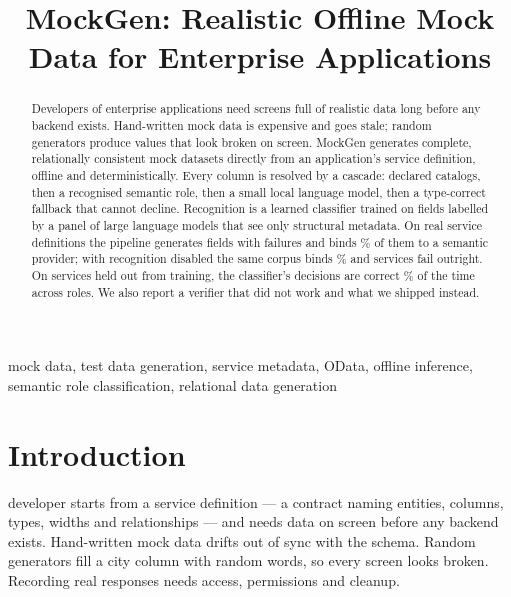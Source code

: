 \documentclass[conference]{IEEEtran}
\newcommand{\system}{MockGen}
\begin{document}
\title{\system: Realistic Offline Mock Data for Enterprise Applications}

\author{
}

\maketitle

\begin{abstract}
Developers of enterprise applications need screens full of realistic
data long before any backend exists. Hand-written mock data is expensive
and goes stale; random generators produce values that look broken on
screen. \system{} generates complete, relationally consistent mock
datasets directly from an application's service definition, offline and
deterministically. Every column is resolved by a cascade: declared
catalogs, then a recognised semantic role, then a small local language
model, then a type-correct fallback that cannot decline. Recognition is
a learned classifier trained on \LabelFields{} fields labelled by a
panel of \LabelJudges{} large language models that see only structural
metadata. On \CorpusServices{} real service definitions the pipeline
generates \CorpusFields{} fields with \CorpusFailed{} failures and binds
\ProviderBoundPct\% of them to a semantic provider; with recognition
disabled the same corpus binds \DetProviderBoundPct\% and
\DetFailed{} services fail outright. On \SealedServices{} services held
out from training, the classifier's decisions are correct
\SealedPrecision\% of the time across \RoutableRoles{} roles. We also
report a verifier that did not work and what we shipped instead.
\end{abstract}

\begin{IEEEkeywords}
mock data, test data generation, service metadata, OData, offline
inference, semantic role classification, relational data generation
\end{IEEEkeywords}

\section{Introduction}
\label{sec:intro}

 developer starts from a service definition
--- a contract naming entities, columns, types, widths and relationships
--- and needs data on screen before any backend exists. Hand-written
mock data drifts out of sync with the schema. Random generators fill a
city column with random words, so every screen looks broken. Recording
real responses needs access, permissions and cleanup.
\end{document}
